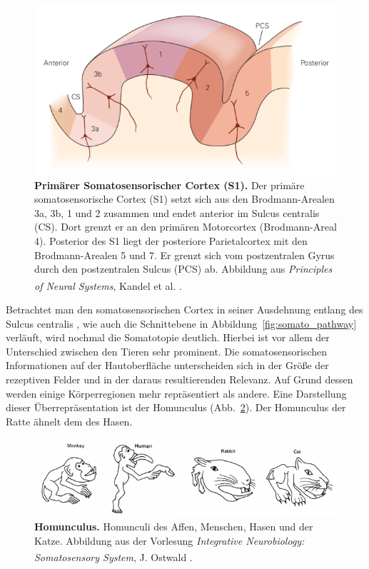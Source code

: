 \documentclass[12pt,a4paper,pdftex]{article}
\begin{document}
\begin{figure}[H]
    \centering
    \includegraphics{pictures/somatosensory/S1_Cortex.png}
    \caption[Primärer Somatosensorischer Cortex]{\textbf{Primärer Somatosensorischer Cortex (S1).} Der primäre somatosensorische Cortex (S1) setzt sich aus den Brodmann-Arealen 3a, 3b, 1 und 2 zusammen und endet anterior im Sulcus centralis (CS). Dort grenzt er an den primären Motorcortex (Brodmann-Areal 4). Posterior des S1 liegt der posteriore Parietalcortex mit den Brodmann-Arealen 5 und 7. Er grenzt sich vom postzentralen Gyrus durch den postzentralen Sulcus (PCS) ab. Abbildung aus \textit{Principles of Neural Systems}, Kandel et al. \textsuperscript{\cite[23]{kandel2013principles}}.}
    \label{fig:S1_Cortex}
\end{figure}

Betrachtet man den somatosensorischen Cortex in seiner Ausdehnung entlang des Sulcus centralis , wie auch die Schnittebene in Abbildung~\ref{fig:somato_pathway} verläuft, wird nochmal die Somatotopie  deutlich. Hierbei ist vor allem der Unterschied zwischen den Tieren sehr prominent. Die somatosensorischen Informationen auf der Hautoberfläche unterscheiden sich in der Größe der rezeptiven Felder und in der daraus resultierenden Relevanz. Auf Grund dessen werden einige Körperregionen mehr repräsentiert als andere. Eine Darstellung dieser Überrepräsentation ist der Homunculus (Abb.~\ref{fig:somato_homunculus}). Der Homunculus  der Ratte ähnelt dem des Hasen.


\begin{figure}[H]
    \centering
    \includegraphics[width = \textwidth] {pictures/somatosensory/homunculus.png}
    \caption[Homunculus]{\textbf{Homunculus.} Homunculi des Affen, Menschen, Hasen und der Katze. Abbildung aus der Vorlesung \textit{Integrative Neurobiology: Somatosensory System}, J. Ostwald \textsuperscript{\cite{Ostwald}}.}
    \label{fig:somato_homunculus}
\end{figure}
\end{document}
